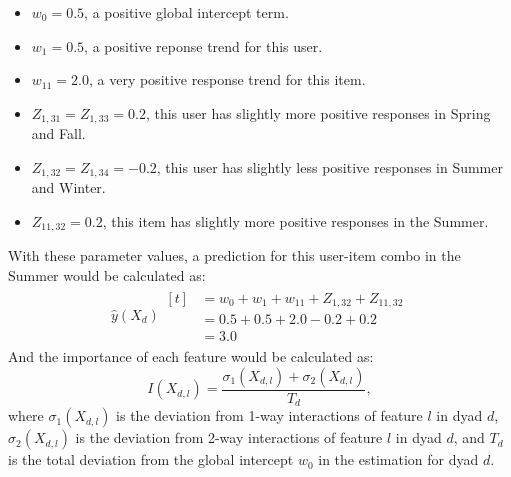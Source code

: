 \documentclass[10pt]{journal}
\begin{document}
\begin{itemize}
    \item  $w_0    = 0.5$, a positive global intercept term.
    \item  $w_1    = 0.5$, a positive reponse trend for this user.
    \item  $w_{11} = 2.0$, a very positive response trend for this item.
    \item  $Z_{1,31} = Z_{1,33} =  0.2$, this user has slightly more positive
        responses in Spring and Fall.
    \item  $Z_{1,32} = Z_{1,34} = -0.2$, this user has slightly less positive
        responses in Summer and Winter.
    \item  $Z_{11,32} = 0.2$, this item has slightly more positive responses in
        the Summer.
\end{itemize}
%
With these parameter values, a prediction for this user-item combo in the Summer
would be calculated as:
%
\begin{align}
    \hat{y}(X_d) \begin{aligned}[t]
         &= w_0 + w_1 + w_{11} + Z_{1,32} + Z_{11,32}  \\
         &= 0.5 + 0.5 + 2.0 - 0.2 + 0.2  \\
         &= 3.0
    \end{aligned}
    \nonumber
\end{align}
%
And the importance of each feature would be calculated as:
%
\begin{equation} \label{eq:importance-single-dyad}
    I(X_{d,l}) = \frac{\sigma_1(X_{d,l}) + \sigma_2(X_{d,l})}{T_d},
\end{equation}
%
where $\sigma_1(X_{d,l})$ is the deviation from 1-way interactions of feature $l$ in
dyad $d$, $\sigma_2(X_{d,l})$ is the deviation from 2-way interactions of feature $l$
in dyad $d$, and $T_d$ is the total deviation from the global intercept $w_0$ in
the estimation for dyad $d$.
\end{document}
